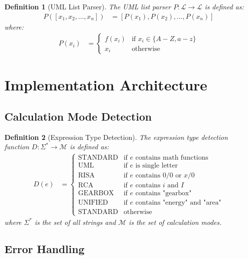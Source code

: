 \documentclass[12pt,a4paper]{article}
\newtheorem{definition}{Definition}
\begin{document}
\begin{definition}[UML List Parser]
The UML list parser $P: \mathcal{L} \rightarrow \mathcal{L}$ is defined as:
\begin{align}
P([x_1, x_2, \ldots, x_n]) &= [P(x_1), P(x_2), \ldots, P(x_n)]
\end{align}
where:
\begin{align}
P(x_i) &= \begin{cases}
f(x_i) & \text{if } x_i \in \{A-Z, a-z\} \\
x_i & \text{otherwise}
\end{cases}
\end{align}
\end{definition}

\section{Implementation Architecture}

\subsection{Calculation Mode Detection}

\begin{definition}[Expression Type Detection]
The expression type detection function $D: \Sigma^* \rightarrow \mathcal{M}$ is defined as:
\begin{align}
D(e) &= \begin{cases}
\text{STANDARD} & \text{if } e \text{ contains math functions} \\
\text{UML} & \text{if } e \text{ is single letter} \\
\text{RISA} & \text{if } e \text{ contains } 0/0 \text{ or } x/0 \\
\text{RCA} & \text{if } e \text{ contains } i \text{ and } I \\
\text{GEARBOX} & \text{if } e \text{ contains "gearbox"} \\
\text{UNIFIED} & \text{if } e \text{ contains "energy" and "area"} \\
\text{STANDARD} & \text{otherwise}
\end{cases}
\end{align}
where $\Sigma^*$ is the set of all strings and $\mathcal{M}$ is the set of calculation modes.
\end{definition}

\subsection{Error Handling}
\end{document}
